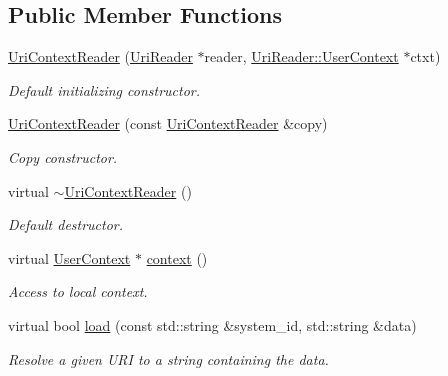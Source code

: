 \subsection*{Public Member Functions}
\begin{DoxyCompactItemize}
\item 
\hyperlink{class_d_d4hep_1_1_x_m_l_1_1_uri_context_reader_aede2321d47f8d747c084287e367b35ac}{UriContextReader} (\hyperlink{class_d_d4hep_1_1_x_m_l_1_1_uri_reader}{UriReader} $\ast$reader, \hyperlink{struct_d_d4hep_1_1_x_m_l_1_1_uri_reader_1_1_user_context}{UriReader::UserContext} $\ast$ctxt)
\begin{DoxyCompactList}\small\item\em Default initializing constructor. \item\end{DoxyCompactList}\item 
\hyperlink{class_d_d4hep_1_1_x_m_l_1_1_uri_context_reader_ae8808c053cfc81ddff19c1be89f95e6e}{UriContextReader} (const \hyperlink{class_d_d4hep_1_1_x_m_l_1_1_uri_context_reader}{UriContextReader} \&copy)
\begin{DoxyCompactList}\small\item\em Copy constructor. \item\end{DoxyCompactList}\item 
virtual \hyperlink{class_d_d4hep_1_1_x_m_l_1_1_uri_context_reader_a065124ec7d3af30801bf471ed4259690}{$\sim$UriContextReader} ()
\begin{DoxyCompactList}\small\item\em Default destructor. \item\end{DoxyCompactList}\item 
virtual \hyperlink{struct_d_d4hep_1_1_x_m_l_1_1_uri_reader_1_1_user_context}{UserContext} $\ast$ \hyperlink{class_d_d4hep_1_1_x_m_l_1_1_uri_context_reader_ad7ba7d778fdc8df96cca1e298003a403}{context} ()
\begin{DoxyCompactList}\small\item\em Access to local context. \item\end{DoxyCompactList}\item 
virtual bool \hyperlink{class_d_d4hep_1_1_x_m_l_1_1_uri_context_reader_a1a6ca7eb85dadbc69463a367f396fe72}{load} (const std::string \&system\_\-id, std::string \&data)
\begin{DoxyCompactList}\small\item\em Resolve a given URI to a string containing the data. \item\end{DoxyCompactList}\item 

\end{DoxyCompactItemize}
